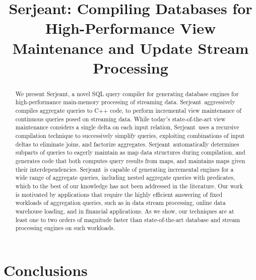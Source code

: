 \documentclass{sig-alternate}
\newcommand{\compiler}{Serjeant}
\begin{document}
\title{Serjeant: Compiling Databases for High-Performance View Maintenance and Update Stream Processing}
\author{
}
\toappear{}
\maketitle

\begin{abstract}
We present \compiler, a novel SQL query compiler for generating database engines
for high-performance main-memory processing of streaming data. \compiler\
aggressively compiles aggregate queries to C++ code, to perform incremental view
maintenance of continuous queries posed on streaming data. While today's
state-of-the-art view maintenance considers a single delta on each input
relation, \compiler\ uses a recursive compilation technique to successively
simplify queries, exploiting combinations of input deltas to eliminate joins,
and factorize aggregates. \compiler\ automatically determines subparts of
queries to eagerly maintain as map data structures during compilation, and
generates code that both computes query results from maps, and maintains maps
given their interdependencies.  \compiler\ is capable of generating incremental
engines for a wide range of aggregate queries, including nested aggregate
queries with predicates, which to the best of our knowledge has not been
addressed in the literature.  Our work is motivated by applications that require
the highly efficient answering of fixed workloads of aggregation queries, such
as in data stream processing, online data warehouse loading, and in financial
applications. As we show, our techniques are at least one to two orders of
magnitude faster than state-of-the-art database and stream processing engines on
such workloads.
\end{abstract}








\section{Conclusions}



\end{document}
